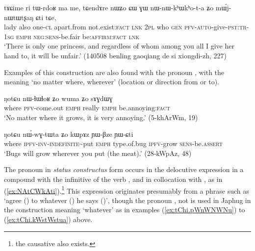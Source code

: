 \begin{exe}
\ex \label{ex:CW.GW.nWnWkhWkhota}
\gll tɤɕime ri tɯ-rdoʁ ma me, tɕendɤre nɯʑo ɕɯ ɣɯ nɯ-nɯ-kʰɯ\redp{}kʰo-t-a ʑo mɯ́j-nɯtɯtʂaŋ ɕti tɕe, \\
lady also one-\textsc{cl} apart.from not.exist:\textsc{fact} \textsc{lnk} \textsc{2pl} who \textsc{gen} \textsc{pfv}-\textsc{auto}-give-\textsc{pst:tr-1sg} \textsc{emph} \textsc{neg:sens}-be.fair be:\textsc{affirm:fact} \textsc{lnk} \\
\glt `There is only one princess, and regardless of whom among you all I give her hand to, it will be unfair.' (140508 benling gaoqiang de si xiongdi-zh, 227)
\end{exe}

Examples of this construction are also found with the pronoun , with the meaning `no matter where, wherever' (location or direction from or to).

\begin{exe}
\ex \label{ex:NotCu.nWnWlhWlhoR}
\gll ŋotɕu nɯ-ɬɯ\redp{}ɬoʁ ʑo wuma ʑo sɤɣdɯɣ \\
where \textsc{pfv}-come.out \textsc{emph} really \textsc{emph} be.annoying:\textsc{fact} \\
\glt `No matter where it grows, it is very annoying.' (5-khArWm, 19)
\end{exe}

\begin{exe}
\ex \label{ex:nWGtWta}
\gll 
ŋotɕu 	nɯ́-wɣ-tɯ\redp{}ta 	ʑo 	kɯpɤz 	ɲɯ-βze 	ɲɯ-ɕti\\
 where \textsc{ipfv-inv}-\textsc{indefinite}\textasciitilde{}put \textsc{emph} type.of.bug \textsc{ipfv}-grow \textsc{sens}-be.\textsc{assert}\\
\glt `Bugs will grow wherever you put (the meat).' (28-kWpAz, 48)
\end{exe}
 
 The pronoun  in \textit{status constructus} form  occurs in the delocutive expression  in a compound with the infinitive  of the verb , and in collocation with , as in (\ref{ex:NAtCWkAti}).\footnote{the causative  also exists.} 
This expression originates presumably from a phrase such as `agree () to whatever () he says ()', though the pronoun , not  is used in Japhug in the construction meaning `whatever' as in examples (\ref{ex:tChi.pWnWNWNu}) to (\ref{ex:tChi.kWstWstua}) above.

